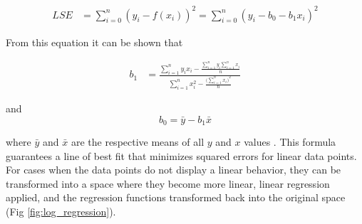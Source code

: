 \begin{align}
\label{eq:least_square}
LSE &= \sum_{i=0}^n (y_i-f(x_i))^2  = \sum_{i=0}^n (y_i- b_0 - b_1x_i)^2
\end{align}

From this equation it can be shown that 

\begin{align}
b_1 &= \frac{\sum_{i=1}^n y_ix_i - \frac{\sum_{i=1}^n y_i \sum_{i=1}^n x_i}{n}}{\sum_{i=1}^n x_i^2 - \frac{\Big(\sum_{i=1}^n x_i \Big)^2}{n}}
\end{align}

and 
$$ b_0 = \bar y - b_1 \bar x $$

where $\bar y$ and $\bar x$ are the respective means of all $y$ and $x$ values \cite{Finney1996}. This formula guarantees a line of best fit that minimizes squared errors for linear data points. For cases when the data points do not display a linear behavior, they can be transformed into a space where they become more linear, linear regression applied, and the regression functions transformed back into the original space (Fig \ref{fig:log_regression}).

